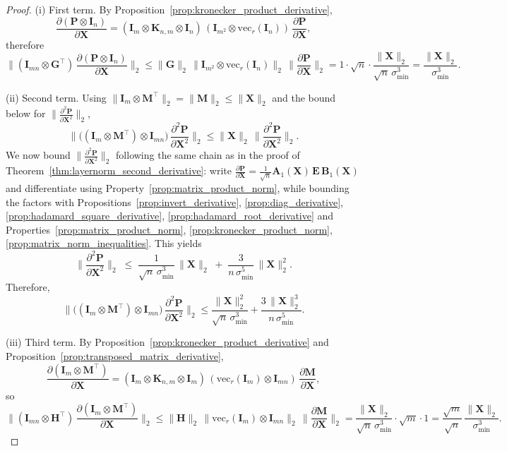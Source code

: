 \documentclass{article}
\begin{document}
\begin{proof}
(i) First term. By Proposition~\ref{prop:kronecker_product_derivative},
\[\frac{\partial (\mathbf{P}\otimes \mathbf{I}_n)}{\partial \mathbf{X}}=(\mathbf{I}_m \otimes \mathbf{K}_{n,m} \otimes \mathbf{I}_n)\,(\mathbf{I}_{m^2} \otimes \mathrm{vec}_r(\mathbf{I}_n))\,\frac{\partial \mathbf{P}}{\partial \mathbf{X}},\]
therefore
\[\Big\|(\mathbf{I}_{mn}\otimes \mathbf{G}^\top)\,\frac{\partial (\mathbf{P}\otimes \mathbf{I}_n)}{\partial \mathbf{X}}\Big\|_2\le \|\mathbf{G}\|_2 \,\|\mathbf{I}_{m^2} \otimes \mathrm{vec}_r(\mathbf{I}_n)\|_2 \,\Big\|\frac{\partial \mathbf{P}}{\partial \mathbf{X}}\Big\|_2= 1 \cdot \sqrt{n} \cdot \frac{\|\mathbf{X}\|_2}{\sqrt{n}\,\sigma_{\min}^3}= \frac{\|\mathbf{X}\|_2}{\sigma_{\min}^3}.\]

(ii) Second term. Using $\|\mathbf{I}_m\otimes \mathbf{M}^\top\|_2=\|\mathbf{M}\|_2\le \|\mathbf{X}\|_2$ and the bound below for $\big\|\tfrac{\partial^2 \mathbf{P}}{\partial \mathbf{X}^2}\big\|_2$,
\[\Big\|\big( (\mathbf{I}_m\otimes \mathbf{M}^\top)\otimes \mathbf{I}_{mn}\big)\,\frac{\partial^2 \mathbf{P}}{\partial \mathbf{X}^2}\Big\|_2\le \|\mathbf{X}\|_2 \,\Big\|\frac{\partial^2 \mathbf{P}}{\partial \mathbf{X}^2}\Big\|_2.\]
We now bound $\big\|\tfrac{\partial^2 \mathbf{P}}{\partial \mathbf{X}^2}\big\|_2$ following the same chain as in the proof of Theorem~\ref{thm:layernorm_second_derivative}:
write $\tfrac{\partial \mathbf{P}}{\partial \mathbf{X}}=\tfrac{1}{\sqrt{n}}\mathbf{A}_1(\mathbf{X})\,\mathbf{E}\,\mathbf{B}_1(\mathbf{X})$ and differentiate using Property~\ref{prop:matrix_product_norm}, while bounding the factors with Propositions~\ref{prop:invert_derivative}, \ref{prop:diag_derivative}, \ref{prop:hadamard_square_derivative}, \ref{prop:hadamard_root_derivative} and Properties~\ref{prop:matrix_product_norm}, \ref{prop:kronecker_product_norm}, \ref{prop:matrix_norm_inequalities}. This yields
\[\Big\|\frac{\partial^2 \mathbf{P}}{\partial \mathbf{X}^2}\Big\|_2\;\le\;\frac{1}{\sqrt{n}\,\sigma_{\min}^3}\,\|\mathbf{X}\|_2\;+\; \frac{3}{n\,\sigma_{\min}^5}\,\|\mathbf{X}\|_2^2.\]
Therefore,
\[\Big\|\big( (\mathbf{I}_m\otimes \mathbf{M}^\top)\otimes \mathbf{I}_{mn}\big)\,\frac{\partial^2 \mathbf{P}}{\partial \mathbf{X}^2}\Big\|_2\le \frac{\|\mathbf{X}\|_2^2}{\sqrt{n}\,\sigma_{\min}^3}+ \frac{3\,\|\mathbf{X}\|_2^3}{n\,\sigma_{\min}^5}.\]

(iii) Third term. By Proposition~\ref{prop:kronecker_product_derivative} and Proposition~\ref{prop:transposed_matrix_derivative},
\[\frac{\partial (\mathbf{I}_m\otimes \mathbf{M}^\top)}{\partial \mathbf{X}}=(\mathbf{I}_m \otimes \mathbf{K}_{n,m} \otimes \mathbf{I}_m)\,(\mathrm{vec}_r(\mathbf{I}_m)\otimes \mathbf{I}_{mn})\,\frac{\partial \mathbf{M}}{\partial \mathbf{X}},\]
so
\[\Big\|(\mathbf{I}_{mn}\otimes \mathbf{H}^\top)\,\frac{\partial (\mathbf{I}_m\otimes \mathbf{M}^\top)}{\partial \mathbf{X}}\Big\|_2\le \|\mathbf{H}\|_2 \,\|\mathrm{vec}_r(\mathbf{I}_m)\otimes \mathbf{I}_{mn}\|_2 \,\Big\|\frac{\partial \mathbf{M}}{\partial \mathbf{X}}\Big\|_2= \frac{\|\mathbf{X}\|_2}{\sqrt{n}\,\sigma_{\min}^3}\cdot \sqrt{m}\cdot 1= \frac{\sqrt{m}}{\sqrt{n}}\,\frac{\|\mathbf{X}\|_2}{\sigma_{\min}^3}.\]


\end{proof}
\end{document}
